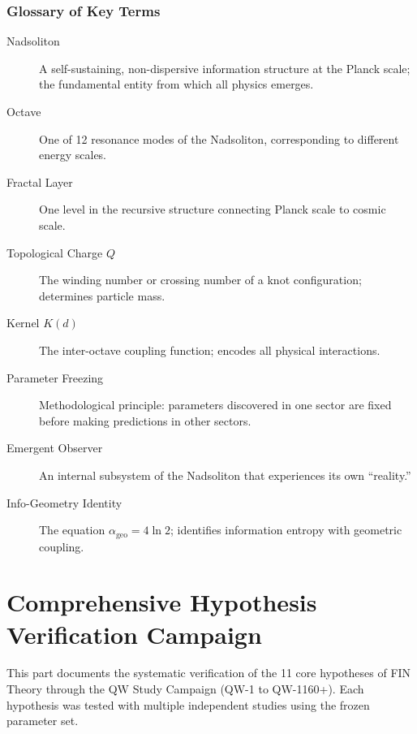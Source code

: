 \documentclass[11pt, a4paper]{article}
\theoremstyle{remark}
\newcommand{\alphageo}{\alpha_{\text{geo}}}
\begin{document}
\section{Glossary of Key Terms}

\begin{description}
    \item[Nadsoliton] A self-sustaining, non-dispersive information structure at the Planck scale; the fundamental entity from which all physics emerges.
    
    \item[Octave] One of 12 resonance modes of the Nadsoliton, corresponding to different energy scales.
    
    \item[Fractal Layer] One level in the recursive structure connecting Planck scale to cosmic scale.
    
    \item[Topological Charge $Q$] The winding number or crossing number of a knot configuration; determines particle mass.
    
    \item[Kernel $K(d)$] The inter-octave coupling function; encodes all physical interactions.
    
    \item[Parameter Freezing] Methodological principle: parameters discovered in one sector are fixed before making predictions in other sectors.
    
    \item[Emergent Observer] An internal subsystem of the Nadsoliton that experiences its own ``reality.''
    
    \item[Info-Geometry Identity] The equation $\alphageo = 4\ln 2$; identifies information entropy with geometric coupling.
\end{description}

\part{Comprehensive Hypothesis Verification Campaign}

This part documents the systematic verification of the 11 core hypotheses of FIN Theory through the QW Study Campaign (QW-1 to QW-1160+). Each hypothesis was tested with multiple independent studies using the frozen parameter set.
\end{document}
